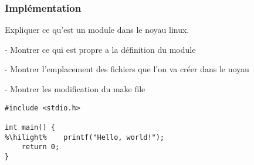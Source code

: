 \subsubsection{Implémentation}

Expliquer ce qu'est un module dans le noyau linux.

    - Montrer ce qui est propre a la définition du module
    
    - Montrer l'emplacement des fichiers que l'on va créer dans le noyau

    - Montrer les modification du make file

\begin{lstlisting}[escapechar=\%]
#include <stdio.h>
    
int main() {
%\hilight%    printf("Hello, world!");
    return 0;
}
\end{lstlisting}
        
